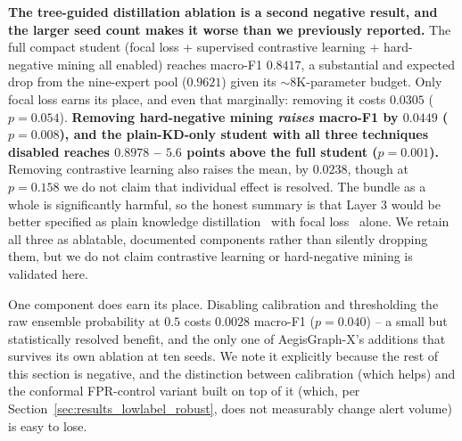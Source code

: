 \documentclass[journal]{IEEEtran}
\begin{document}
\textbf{The tree-guided distillation ablation is a second negative result,
and the larger seed count makes it worse than we previously reported.} The
full compact student (focal loss + supervised contrastive learning +
hard-negative mining all enabled) reaches macro-F1 $0.8417$, a substantial
and expected drop from the nine-expert pool ($0.9621$) given its
$\sim$8K-parameter budget. Only focal loss earns its place, and even that
marginally: removing it costs $0.0305$ ($p = 0.054$).
\textbf{Removing hard-negative mining \emph{raises} macro-F1 by $0.0449$
($p = 0.008$), and the plain-KD-only student with all three techniques
disabled reaches $0.8978$ -- $5.6$ points above the full student
($p = 0.001$).} Removing contrastive learning also raises the mean, by
$0.0238$, though at $p = 0.158$ we do not claim that individual effect is
resolved. The bundle as a whole is significantly harmful, so the honest
summary is that Layer 3 would be better specified as plain knowledge
distillation~\cite{hinton2015distilling} with focal
loss~\cite{lin2017focal} alone. We retain all three as ablatable,
documented components rather than silently dropping them, but we do not
claim contrastive learning or hard-negative mining is validated here.

One component does earn its place. Disabling calibration and thresholding
the raw ensemble probability at $0.5$ costs $0.0028$ macro-F1
($p = 0.040$) -- a small but statistically resolved benefit, and the only
one of AegisGraph-X's additions that survives its own ablation at ten seeds.
We note it explicitly because the rest of this section is negative, and the
distinction between calibration (which helps) and the conformal FPR-control
variant built on top of it (which, per
Section~\ref{sec:results_lowlabel_robust}, does not measurably change alert
volume) is easy to lose.
\end{document}
